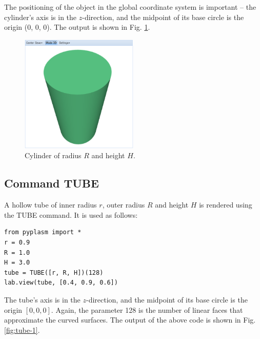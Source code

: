 \documentclass{article}
\begin{document}
The positioning of the object in the global 
coordinate system is important -- the cylinder's axis is in 
the $z$-direction, and the midpoint of its base circle is the 
origin (0, 0, 0). The output is shown in Fig. \ref{fig:cyl-1}.
\newpage

\begin{figure}[!ht]
\begin{center}
\includegraphics[width=0.5\textwidth]{img/cyl-1.png}
\end{center}
\vspace{-2mm}
\caption{Cylinder of radius $R$ and height $H$.}
\label{fig:cyl-1}
\end{figure}

\subsection{Command TUBE}

A hollow tube of inner radius $r$, outer radius $R$ and height
$H$ is rendered using the TUBE command. It is used as follows:
\begin{verbatim}
from pyplasm import *
r = 0.9
R = 1.0
H = 3.0
tube = TUBE([r, R, H])(128)
lab.view(tube, [0.4, 0.9, 0.6])
\end{verbatim}
The tube's axis is in the $z$-direction, and the midpoint of
its base circle is the origin $[0, 0, 0]$. Again, the parameter
128 is the number of linear faces that approximate the 
curved surfaces. The output of the above code is shown in Fig. \ref{fig:tube-1}.

\newpage
\end{document}
